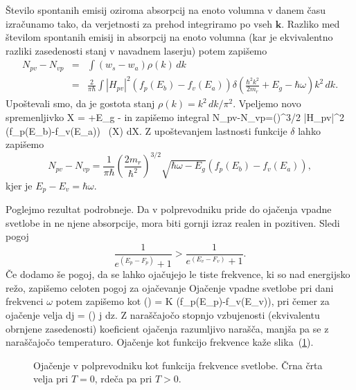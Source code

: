 Število spontanih emisij oziroma absorpcij na enoto volumna v danem času izračunamo tako,
da verjetnosti za prehod integriramo po vseh $\mathbf{k}$. Razliko med številom 
spontanih emisij in absorpcij na enoto volumna (kar je ekvivalentno razliki 
zasedenosti stanj v navadnem laserju) potem zapišemo 
\begin{eqnarray}  
N_{pv}-N_{vp}&=&\int\left(w_s-w_a\right)\rho(k)\,dk  \nonumber \\
&=&\frac{2}{\pi\hbar} \int |H_{pv}|^2\left(f_p(E_b)-f_v(E_a)\right)
\delta \left(\frac{\hbar^2 k^2}{2m_r}+E_g -\hbar\omega\right) k^2\,dk.
\label{6.7}
\end{eqnarray}
Upoštevali smo, da je gostota stanj $\rho(k)=k^2\, dk/\pi^2$. Vpeljemo
novo spremenljivko 
\beq
X = +E_g -\hbar\omega
\eeq
in zapišemo integral
\beq
N_{pv}-N_{vp}=\left(\right)^{3/2} 
\int |H_{pv}|^2 \left(f_p(E_b)-f_v(E_a)\right)
\,
\delta (X) dX.
\label{6.7a}
\eeq
Z upoštevanjem lastnosti funkcije $\delta$ lahko zapišemo
\begin{equation}  
N_{pv}-N_{vp}=\frac{1}{\pi\hbar}\left(\frac{2m_r}{\hbar^2}\right)^{3/2}
\sqrt{\hbar \omega-E_g}\left(f_p(E_b)-f_v(E_a)\right),
\label{6.11}
\end{equation}
kjer je $E_p-E_v = \hbar \omega$. 

Poglejmo rezultat podrobneje. Da v polprevodniku pride do ojačenja 
vpadne svetlobe in ne njene absorpcije, mora biti gornji izraz 
realen in pozitiven. Sledi pogoj
\begin{equation}  
\frac{1}{e^{(E_p-F_{p})}+1}>\frac{1}{e^{(E_v-F_v)}+1}.
\label{6.12}
\end{equation}
Če dodamo še pogoj, da se lahko ojačujejo le tiste frekvence, ki so 
nad energijsko režo, zapišemo celoten pogoj za ojačevanje 
Ojačenje vpadne svetlobe pri dani 
frekvenci $\omega$ potem zapišemo kot
\beq
\gamma(\omega) = K \left(f_p(E_p)-f_v(E_v)\right),
\eeq
pri čemer za ojačenje velja
\beq
dj = \gamma(\omega) j dz.
\eeq
Z naraščajočo stopnjo vzbujenosti (ekvivalentu obrnjene zasedenosti) 
koeficient ojačenja razumljivo narašča, manjša pa se z naraščajočo 
temperaturo. Ojačenje kot funkcijo frekvence kaže slika~(\ref{s6.11}).
\begin{figure}[h]
\centering
\def\svgwidth{70truemm} 

\caption{Ojačenje v polprevodniku kot funkcija frekvence svetlobe. Črna črta
velja pri $T=0$, rdeča pa pri $T>0$. 
}
\label{s6.11}
\end{figure}

